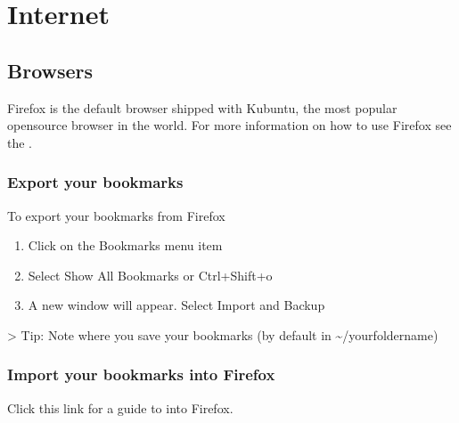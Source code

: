 \documentclass[letterpaper,10pt,english]{sphinxmanual}
\begin{document}
\section{Internet}
\label{\detokenize{docs/software:internet}}

\subsection{Browsers}
\label{\detokenize{docs/software:browsers}}
\sphinxAtStartPar
Firefox is the default browser shipped with Kubuntu, the most popular open\sphinxhyphen{}source browser in the world. For more information on how to use Firefox see the .


\subsubsection{Export your bookmarks}
\label{\detokenize{docs/software:export-your-bookmarks}}
\sphinxAtStartPar
To export your bookmarks from Firefox
\begin{enumerate}
%
\item {} 
\sphinxAtStartPar
Click on the Bookmarks menu item

\item {} 
\sphinxAtStartPar
Select Show All Bookmarks or Ctrl+Shift+o

\item {} 
\sphinxAtStartPar
A new window will appear. Select Import and Backup

\end{enumerate}

\sphinxAtStartPar
\textgreater{} Tip: Note where you save your bookmarks (by default in \textasciitilde{}/yourfoldername)


\subsubsection{Import your bookmarks into Firefox}
\label{\detokenize{docs/software:import-your-bookmarks-into-firefox}}
\sphinxAtStartPar
Click this link for a guide to  into Firefox.
\end{document}
